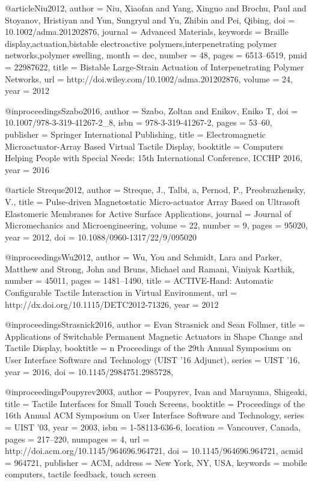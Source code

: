 @article{Niu2012,
author = {Niu, Xiaofan and Yang, Xinguo and Brochu, Paul and Stoyanov, Hristiyan and Yun, Sungryul and Yu, Zhibin and Pei, Qibing},
doi = {10.1002/adma.201202876},
journal = {Advanced Materials},
keywords = {Braille display,actuation,bistable electroactive polymers,interpenetrating polymer networks,polymer swelling},
month = {dec},
number = {48},
pages = {6513--6519},
pmid = {22987622},
title = {{Bistable Large-Strain Actuation of Interpenetrating Polymer Networks}},
url = {http://doi.wiley.com/10.1002/adma.201202876},
volume = {24},
year = {2012}
}

@inproceedings{Szabo2016,
author = {Szabo, Zoltan and Enikov, Eniko T},
doi = {10.1007/978-3-319-41267-2_8},
isbn = {978-3-319-41267-2},
pages = {53--60},
publisher = {Springer International Publishing},
title = {{Electromagnetic Microactuator-Array Based Virtual Tactile Display}},
booktitle = {Computers Helping People with Special Needs: 15th International Conference, ICCHP 2016},
year = {2016}
}

@article {Streque2012,
	author = {Streque, J., Talbi, a, Pernod, P., Preobrazhensky, V.},
    title = {{Pulse-driven Magnetostatic Micro-actuator Array Based on Ultrasoft Elastomeric Membranes for Active Surface Applications}},
    journal = {Journal of Micromechanics and Microengineering},
    volume = {22},
	number = {9},
	pages = {95020},
	year = {2012},
	doi = {10.1088/0960-1317/22/9/095020}
}


@inproceedings{Wu2012,
author = {Wu, You and Schmidt, Lara and Parker, Matthew and Strong, John and Bruns, Michael and Ramani, Viniyak Karthik},
number = {45011},
pages = {1481--1490},
title = {{ACTIVE-Hand: Automatic Configurable Tactile Interaction in Virtual Environment}},
url = {http://dx.doi.org/10.1115/DETC2012-71326},
year = {2012}
}


@inproceedings{Strasnick2016,
	author = {Evan Strasnick and Sean Follmer},
	title = {{Applications of Switchable Permanent Magnetic Actuators in Shape Change and Tactile Display}},
	booktitle = {n Proceedings of the 29th Annual Symposium on User Interface Software and Technology (UIST '16 Adjunct)},
	series = {UIST '16},
	year = {2016},
	doi = {10.1145/2984751.2985728},
    }
    
@inproceedings{Poupyrev2003,
	author = {Poupyrev, Ivan and Maruyama, Shigeaki},
	title = {{Tactile Interfaces for Small Touch Screens}},
	booktitle = {Proceedings of the 16th Annual ACM Symposium on User Interface Software and Technology},
	series = {UIST '03},
	year = {2003},
	isbn = {1-58113-636-6},
	location = {Vancouver, Canada},
	pages = {217--220},
	numpages = {4},
	url = {http://doi.acm.org/10.1145/964696.964721},
	doi = {10.1145/964696.964721},
	acmid = {964721},
	publisher = {ACM},
	address = {New York, NY, USA},
	keywords = {mobile computers, tactile feedback, touch screen}
}

